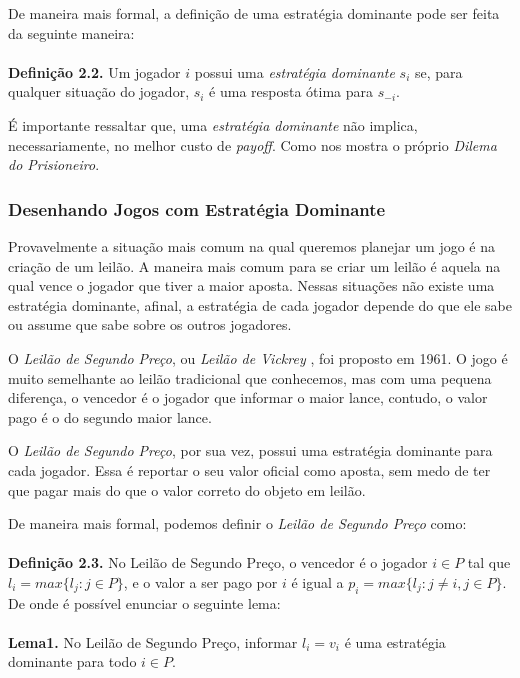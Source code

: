 \documentclass[twoside,conference,a4paper]{IEEEtran}
\begin{document}
            De maneira mais formal, a definição de uma estratégia dominante pode ser feita da seguinte maneira:\\ \\
            \textbf{Definição 2.2.} Um jogador $i$ possui uma \emph{estratégia dominante} $s_i$ se, para qualquer situação do jogador, $s_i$ é uma resposta ótima para $s_{-i}$.
            
            É importante ressaltar que, uma \emph{estratégia dominante} não implica, necessariamente, no melhor custo de \emph{payoff}. Como nos mostra o próprio \emph{Dilema do Prisioneiro}.
        
            \subsubsection{Desenhando Jogos com Estratégia Dominante}
                Provavelmente a situação mais comum na qual queremos planejar um jogo é na criação de um leilão. A maneira mais comum para se criar um leilão é aquela na qual vence o jogador que tiver a maior aposta. Nessas situações não existe uma estratégia dominante, afinal, a estratégia de cada jogador depende do que ele sabe ou assume que sabe sobre os outros jogadores.
                
                O \emph{Leilão de Segundo Preço}, ou \emph{Leilão de Vickrey} \cite{ausubel2006lovely}, foi proposto em 1961. O jogo é muito semelhante ao leilão tradicional que conhecemos, mas com uma pequena diferença, o vencedor é o jogador que informar o maior lance, contudo, o valor pago é o do segundo maior lance. 
                
                O \emph{Leilão de Segundo Preço}, por sua vez, possui uma estratégia dominante para cada jogador. Essa é reportar o seu valor oficial como aposta, sem medo de ter que pagar mais do que o valor correto do objeto em leilão.
                
                De maneira mais formal, podemos definir o \emph{Leilão de Segundo Preço} como:  \\ \\
                \textbf{Definição 2.3.} No Leilão de Segundo Preço, o vencedor é o jogador $i \in P$ tal que $l_i = max\{l_j : j \in P\}$, e o valor a ser pago por $i$ é igual a $p_i = max\{ l_j : j \neq i, j \in P\}$. \\
                
                De onde é possível enunciar o seguinte lema: \\ \\
                \textbf{Lema1.} No Leilão de Segundo Preço, informar $l_i = v_i$ é uma estratégia dominante para todo $i \in P$. \\
                
\end{document}
